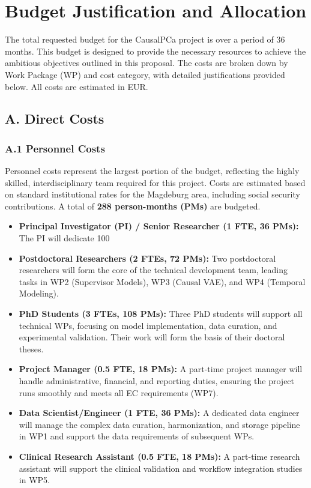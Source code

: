 \section*{Budget Justification and Allocation}

The total requested budget for the CausalPCa project is \textbf{} over a period of 36 months. This budget is designed to provide the necessary resources to achieve the ambitious objectives outlined in this proposal. The costs are broken down by Work Package (WP) and cost category, with detailed justifications provided below. All costs are estimated in EUR.

\subsection*{A. Direct Costs}

\subsubsection*{A.1 Personnel Costs}
Personnel costs represent the largest portion of the budget, reflecting the highly skilled, interdisciplinary team required for this project. Costs are estimated based on standard institutional rates for the Magdeburg area, including social security contributions. A total of \textbf{288 person-months (PMs)} are budgeted.

\begin{itemize}
    \item \textbf{Principal Investigator (PI) / Senior Researcher (1 FTE, 36 PMs):} The PI will dedicate 100%
    \item \textbf{Postdoctoral Researchers (2 FTEs, 72 PMs):} Two postdoctoral researchers will form the core of the technical development team, leading tasks in WP2 (Supervisor Models), WP3 (Causal VAE), and WP4 (Temporal Modeling).
    \item \textbf{PhD Students (3 FTEs, 108 PMs):} Three PhD students will support all technical WPs, focusing on model implementation, data curation, and experimental validation. Their work will form the basis of their doctoral theses.
    \item \textbf{Project Manager (0.5 FTE, 18 PMs):} A part-time project manager will handle administrative, financial, and reporting duties, ensuring the project runs smoothly and meets all EC requirements (WP7).
    \item \textbf{Data Scientist/Engineer (1 FTE, 36 PMs):} A dedicated data engineer will manage the complex data curation, harmonization, and storage pipeline in WP1 and support the data requirements of subsequent WPs.
    \item \textbf{Clinical Research Assistant (0.5 FTE, 18 PMs):} A part-time research assistant will support the clinical validation and workflow integration studies in WP5.
\end{itemize}

